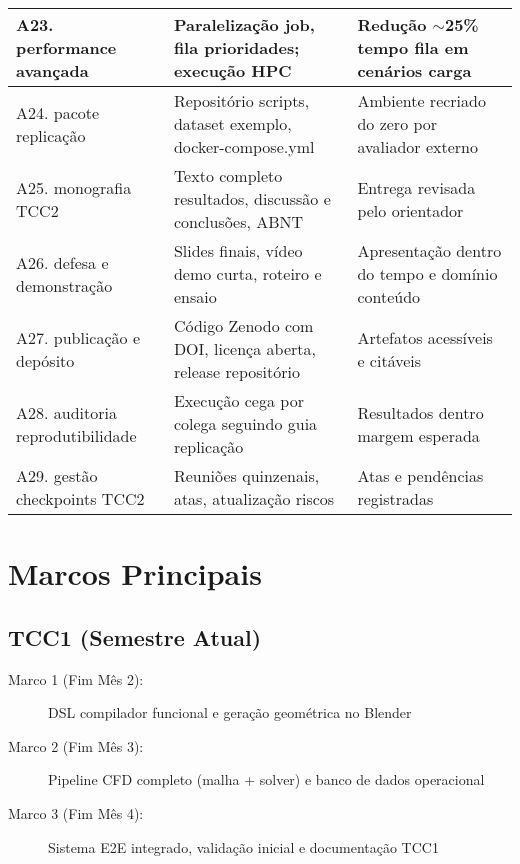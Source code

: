 \begin{landscape}
\begin{table}[htb]
{\begin{tabular}{p{6cm}p{10cm}p{8cm}}
\midrule
A23. performance avançada & Paralelização job, fila prioridades; execução HPC & Redução $\sim$25\% tempo fila em cenários carga \\
\midrule
A24. pacote replicação & Repositório scripts, dataset exemplo, docker-compose.yml & Ambiente recriado do zero por avaliador externo \\
\midrule
A25. monografia TCC2 & Texto completo resultados, discussão e conclusões, ABNT & Entrega revisada pelo orientador \\
\midrule
A26. defesa e demonstração & Slides finais, vídeo demo curta, roteiro e ensaio & Apresentação dentro do tempo e domínio conteúdo \\
\midrule
A27. publicação e depósito & Código Zenodo com DOI, licença aberta, release repositório & Artefatos acessíveis e citáveis \\
\midrule
A28. auditoria reprodutibilidade & Execução cega por colega seguindo guia replicação & Resultados dentro margem esperada \\
\midrule
A29. gestão checkpoints TCC2 & Reuniões quinzenais, atas, atualização riscos & Atas e pendências registradas \\
\bottomrule
\end{tabular}%
}
\end{table}
\end{landscape}

\section{Marcos Principais}

\subsection{TCC1 (Semestre Atual)}

\begin{description}
    \item[Marco 1 (Fim Mês 2):] DSL compilador funcional e geração geométrica no Blender
    \item[Marco 2 (Fim Mês 3):] Pipeline CFD completo (malha + solver) e banco de dados operacional
    \item[Marco 3 (Fim Mês 4):] Sistema E2E integrado, validação inicial e documentação TCC1
\end{description}

